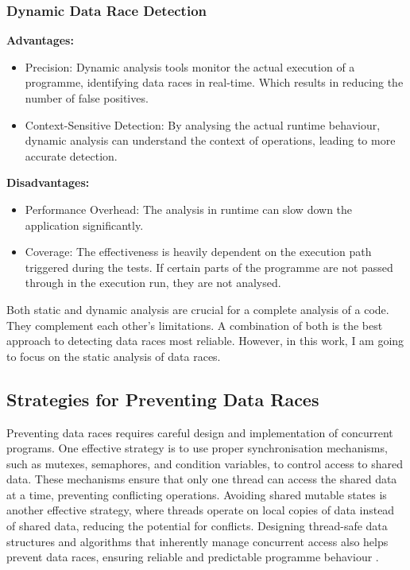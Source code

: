 \documentclass[
fancyheadings, %
%
%
]{stsreprt}
\begin{document}
{		\subsubsection{Dynamic Data Race Detection \cite{flanagan2009}}
		\textbf{Advantages:}
		\begin{itemize}
			\item Precision: Dynamic analysis tools monitor the actual execution of a programme, identifying data races in real-time. Which results in reducing the number of false positives.
			\item Context-Sensitive Detection: By analysing the actual runtime behaviour, dynamic analysis can understand the context of operations, leading to more accurate detection. 
		\end{itemize}
		\textbf{Disadvantages:}
		\begin{itemize}
			\item Performance Overhead: The analysis in runtime can slow down the application significantly. 
			\item Coverage: The effectiveness is heavily dependent on the execution path triggered during the tests. If certain parts of the programme are not passed through in the execution run, they are not analysed.
		\end{itemize}
		
		Both static and dynamic analysis are crucial for a complete analysis of a code. They complement each other's limitations. A combination of both is the best approach to detecting data races most reliable. However, in this work, I am going to focus on the static analysis of data races.
		
		
		\subsection{Strategies for Preventing Data Races}
		
		Preventing data races requires careful design and implementation of concurrent programs. One effective strategy is to use proper synchronisation mechanisms, such as mutexes, semaphores, and condition variables, to control access to shared data. These mechanisms ensure that only one thread can access the shared data at a time, preventing conflicting operations. Avoiding shared mutable states is another effective strategy, where threads operate on local copies of data instead of shared data, reducing the potential for conflicts. Designing thread-safe data structures and algorithms that inherently manage concurrent access also helps prevent data races, ensuring reliable and predictable programme behaviour \cite{herlihy2008}.
		
}
\end{document}
